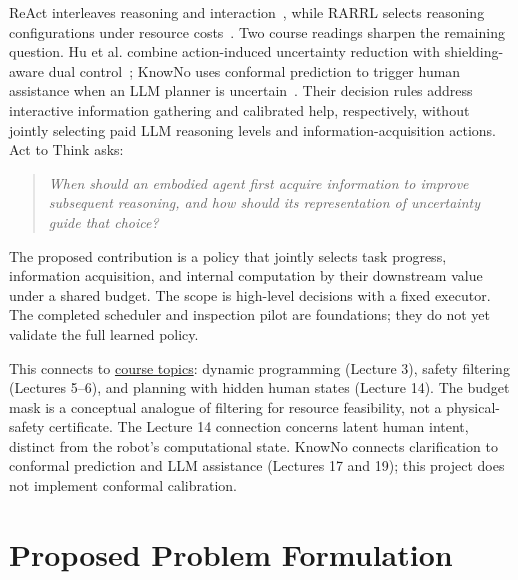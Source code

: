 \documentclass[conference]{IEEEtran}
\begin{document}
ReAct interleaves reasoning and interaction~\cite{yao2023react}, while RARRL selects reasoning configurations under resource costs~\cite{liu2026rarrl}. Two course readings sharpen the remaining question. Hu et al. combine action-induced uncertainty reduction with shielding-aware dual control~\cite{hu2024dual}; KnowNo uses conformal prediction to trigger human assistance when an LLM planner is uncertain~\cite{ren2023knowno}. Their decision rules address interactive information gathering and calibrated help, respectively, without jointly selecting paid LLM reasoning levels and information-acquisition actions. Act to Think asks:
\begin{quote}
\emph{When should an embodied agent first acquire information to improve subsequent reasoning, and how should its representation of uncertainty guide that choice?}
\end{quote}
The proposed contribution is a policy that jointly selects task progress, information acquisition, and internal computation by their downstream value under a shared budget. The scope is high-level decisions with a fixed executor. The completed scheduler and inspection pilot are foundations; they do not yet validate the full learned policy.

This connects to \href{https://alliance-ai.cs.jhu.edu/teaching/HCR/}{course topics}: dynamic programming (Lecture 3), safety filtering (Lectures 5--6), and planning with hidden human states (Lecture 14). The budget mask is a conceptual analogue of filtering for resource feasibility, not a physical-safety certificate. The Lecture 14 connection concerns latent human intent, distinct from the robot's computational state. KnowNo connects clarification to conformal prediction and LLM assistance (Lectures 17 and 19); this project does not implement conformal calibration.

\section{Proposed Problem Formulation}
\end{document}
